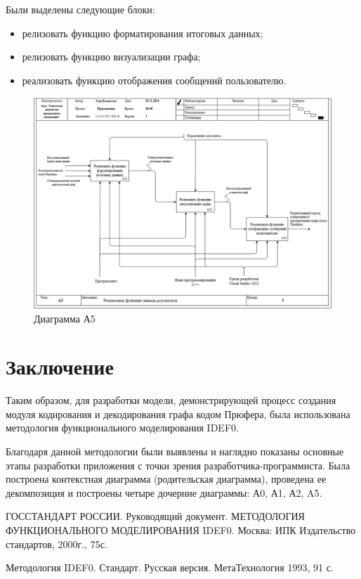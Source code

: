 \documentclass[a4paper, final]{article}
\begin{document}
Были выделены следующие блоки:
\begin{itemize}
	\item релизовать функцию форматирования итоговых данных;
	\item релизовать функцию визуализации графа;
	\item реализовать функцию отображения сообщений пользователю.
\end{itemize} 

\newpage
\begin{figure}[H]
	\centering
	\includegraphics[width=\linewidth]{A5.png}
	\caption{Диаграмма А5}
	\label{img:A5}
\end{figure}



\cleardoublepage
{}
\newpage
{}
\section*{Заключение}
Таким образом, для разработки модели, демонстрирующей процесс создания модуля кодирования и декодирования графа кодом Прюфера,
была использована методология функционального моделирования IDEF0.

Благодаря данной методологии были выявлены и наглядно показаны основные этапы разработки приложения с точки зрения 
разработчика-программиста. Была построена контекстная диаграмма (родительская диаграмма), проведена ее декомпозиция и 
построены четыре дочерние диаграммы: А0, А1, А2, A5. 

\cleardoublepage
{}
\newpage
\begin{thebibliography}{0}
	ГОССТАНДАРТ РОССИИ. Руководящий документ. МЕТОДОЛОГИЯ ФУНКЦИОНАЛЬНОГО МОДЕЛИРОВАНИЯ IDEF0. 
	Москва: ИПК Издательство стандартов, 2000г., 75с.

	Методология IDEF0. Стандарт. Русская версия. МетаТехнология 1993, 91 с.
\end{thebibliography}
\end{document}
